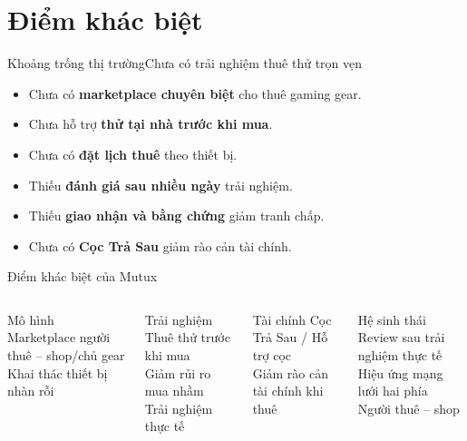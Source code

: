 \section{Điểm khác biệt}

\begin{frame}{Khoảng trống thị trường}{Chưa có trải nghiệm thuê thử trọn vẹn}
  \begin{itemize}\normalsize
    \item Chưa có \textbf{marketplace chuyên biệt} cho thuê gaming gear.
    \item Chưa hỗ trợ \textbf{thử tại nhà trước khi mua}.
    \item Chưa có \textbf{đặt lịch thuê} theo thiết bị.
    \item Thiếu \textbf{đánh giá sau nhiều ngày} trải nghiệm.
    \item Thiếu \textbf{giao nhận và bằng chứng} giảm tranh chấp.
    \item Chưa có \textbf{Cọc Trả Sau} giảm rào cản tài chính.
  \end{itemize}
\end{frame}

\begin{frame}{Điểm khác biệt của Mutux}
  \centering
  \begin{columns}[T,onlytextwidth]
      \begin{block}{\centering Mô hình}
        \centering\small
        Marketplace người thuê -- shop/chủ gear\\
        Khai thác thiết bị nhàn rỗi
      \end{block}
      \begin{block}{\centering Trải nghiệm}
        \centering\small
        Thuê thử trước khi mua\\
        Giảm rủi ro mua nhầm\\
        Trải nghiệm thực tế
      \end{block}
      \begin{exampleblock}{\centering Tài chính}
        \centering\small
        Cọc Trả Sau / Hỗ trợ cọc\\
        Giảm rào cản tài chính khi thuê
      \end{exampleblock}
      \begin{exampleblock}{\centering Hệ sinh thái}
        \centering\small
        Review sau trải nghiệm thực tế\\
        Hiệu ứng mạng lưới hai phía\\
        Người thuê -- shop
      \end{exampleblock}
  \end{columns}
  \vfill
\end{frame}
